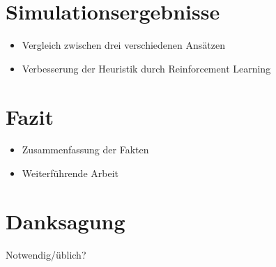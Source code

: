 \documentclass[conference]{IEEEtran}
\begin{document}


\section{Simulationsergebnisse}
\begin{itemize}
\item Vergleich zwischen drei verschiedenen Ansätzen
\item Verbesserung der Heuristik durch Reinforcement Learning
\end{itemize}




\section{Fazit}
\begin{itemize}
\item Zusammenfassung der Fakten
\item Weiterführende Arbeit
\end{itemize}







\section*{Danksagung}


Notwendig/üblich?







%
%
%
\end{document}
